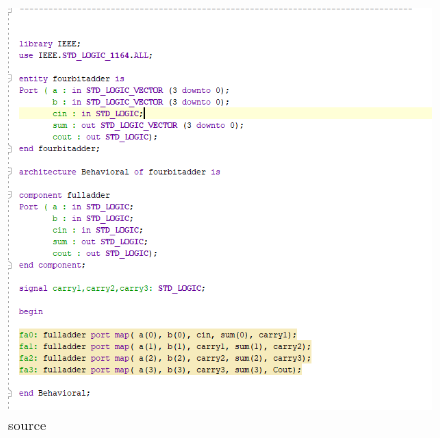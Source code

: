 \documentclass{article}
\begin{document}
\begin{figure}[h]
\begin{center}
\includegraphics[width=1\textwidth]{fourBitAdderSource.png} %
\caption{source}
\end{center}
\end{figure}
\end{document}
